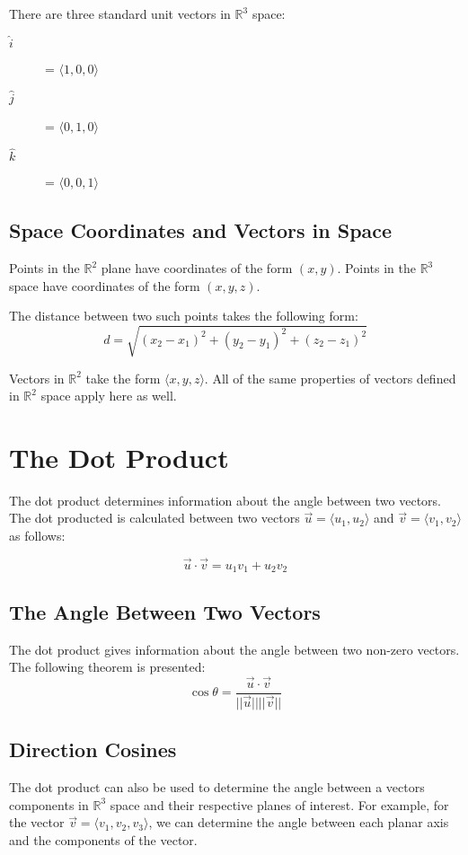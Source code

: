 There are three standard unit vectors in $\mathbb{R}^3$ space:
\begin{description}
  \item[$\hat{i}$] = $\langle 1,0,0 \rangle$
  \item[$\hat{j}$] = $\langle 0,1,0 \rangle$
  \item[$\hat{k}$] = $\langle 0,0,1 \rangle$
\end{description}

\subsection{Space Coordinates and Vectors in Space}
Points in the $\mathbb{R}^2$ plane have coordinates of the form $(x,y)$. Points
in the $\mathbb{R}^3$ space have coordinates of the form $(x,y,z)$.

The distance between two such points takes the following form:
\begin{equation}
  d=\sqrt{(x_2-x_1)^2+(y_2-y_1)^2+(z_2-z_1)^2}
\end{equation}

Vectors in $\mathbb{R}^2$ take the form $\langle x,y,z \rangle$. All of the same
properties of vectors defined in $\mathbb{R}^2$ space apply here as well.

\section{The Dot Product}
The dot product determines information about the angle between two vectors. The
dot producted is calculated between two vectors $\vec{u}=\langle u_1,u_2
\rangle$ and $\vec{v}=\langle v_1,v_2 \rangle$ as follows:

\begin{equation}
  \vec{u} \cdot \vec{v} = u_1v_1 + u_2v_2
\end{equation}

\subsection{The Angle Between Two Vectors}
The dot product gives information about the angle between two non-zero vectors.
The following theorem is presented:
\begin{equation}
  \cos\theta = \frac{\vec{u}\cdot\vec{v}}{||\vec{u}||||\vec{v}||}
\end{equation}

\subsection{Direction Cosines}
The dot product can also be used to determine the angle between a vectors
components in $\mathbb{R}^3$ space and their respective planes of interest. For
example, for the vector $\vec{v} = \langle v_1,v_2,v_3 \rangle$, we can
determine the angle between each planar axis and the components of the vector.

